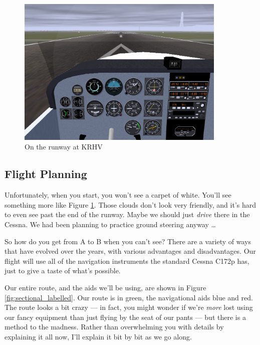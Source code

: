 

\begin{figure}
  \begin{center}
    \includegraphics[width=10cm]{img/KRHV.png}
    \caption{On the runway at KRHV}
    \label{fig:KRHV}
  \end{center}
\end{figure}

\subsection{Flight Planning}

Unfortunately, when you start, you won't see a carpet of white.
You'll see something more like Figure \ref{fig:KRHV}.  Those clouds
don't look very friendly, and it's hard to even see past the end of
the runway.  Maybe we should just \emph{drive} there in the Cessna.
We had been planning to practice ground steering anyway \ldots{}

So how do you get from A to B when you can't see?  There are a variety
of ways that have evolved over the years, with various advantages and
disadvantages.  Our flight will use all of the navigation instruments
the standard Cessna C172p has, just to give a taste of what's
possible.

Our entire route, and the aids we'll be using, are shown in
Figure \ref{fig:sectional_labelled}.  Our route is in green, the
navigational aids blue and red.  The route looks a bit crazy --- in
fact, you might wonder if we're \emph{more} lost using our fancy
equipment than just flying by the seat of our pants --- but there is a
method to the madness.  Rather than overwhelming you with details by
explaining it all now, I'll explain it bit by bit as we go along.


